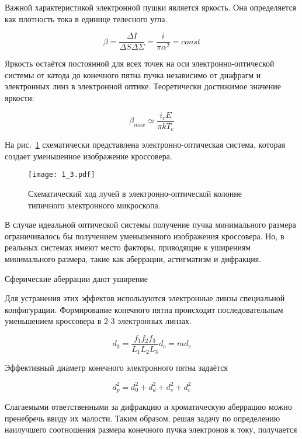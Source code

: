 Важной характеристикой электронной пушки является яркость. Она определяется как плотность тока в единице телесного угла.

\begin{equation}
\beta = \frac{\Delta I}{\Delta S\Delta\Sigma}= \frac{i}{\pi \alpha^2}= const
\label{eq:A2}
\end{equation}

Яркость остаётся постоянной для всех точек на оси электронно-оптической системы от катода до конечного пятна пучка независимо от диафрагм и электронных линз в электронной оптике. Теоретически достижимое значение яркости:

\begin{equation}
\beta_{max} \simeq \frac{i_c E}{\pi kT_c}
\label{eq:A3}
\end{equation}

На рис.~\ref{fig:3} схематически представлена электронно-оптическая система, которая создает уменьшенное изображение кроссовера.

\begin{figure}[H]
\center
\texttt{[image: 1\_3.pdf]}
\caption{Схематический ход лучей в электронно-оптической колонне типичного электронного микроскопа.}
\label{fig:3}
\end{figure}

В случае идеальной оптической системы получение пучка минимального размера ограничивалось бы получением уменьшенного изображения кроссовера. Но, в реальных системах имеют место факторы, приводящие к уширениям минимального размера, такие как аберрации, астигматизм и дифракция.

Сферические аберрации дают уширение


Для устранения этих эффектов используются электронные линзы специальной конфигурации.
Формирование конечного пятна происходит последовательным уменьшением кроссовера в 2-3 электронных линзах.

\begin{equation}
d_0= \frac{f_1 f_2 f_3}{L_1 L_2 L_3} d_c = md_c
\label{eq:A4}
\end{equation}

Эффективный диаметр конечного электронного пятна задаётся

\begin{equation}
d_p^2=d_0^2+d_d^2+d_s^2+d_c^2
\label{eq:A5}
\end{equation}

Слагаемыми ответственными за дифракцию и хроматическую аберрацию можно пренебречь ввиду их малости. Таким образом, решая задачу по определению наилучшего соотношения размера конечного пучка электронов к току, получается

